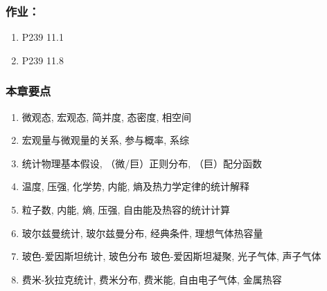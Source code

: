 \begin{frame}[label=current]
  \frametitle{作业：}
\begin{enumerate}
  \item P239 11.1
  \item P239 11.8 
\end{enumerate}



\end{frame} 

\begin{frame}[label=current]
  \frametitle{本章要点}
  \begin{enumerate}
    \item 微观态, 宏观态, 简并度, 态密度, 相空间
    \item 宏观量与微观量的关系, 参与概率, 系综
    \item 统计物理基本假设, （微/巨）正则分布, （巨）配分函数
    \item 温度, 压强, 化学势, 内能, 熵及热力学定律的统计解释
    \item 粒子数, 内能, 熵, 压强, 自由能及热容的统计计算
    \item 玻尔兹曼统计, 玻尔兹曼分布, 经典条件, 理想气体热容量 
    \item 玻色-爱因斯坦统计, 玻色分布 玻色-爱因斯坦凝聚, 光子气体, 声子气体
    \item 费米-狄拉克统计, 费米分布, 费米能, 自由电子气体, 金属热容
  \end{enumerate}

\end{frame} 